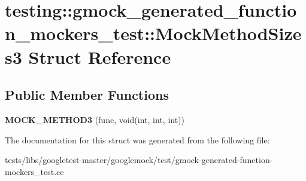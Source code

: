 \hypertarget{structtesting_1_1gmock__generated__function__mockers__test_1_1MockMethodSizes3}{}\section{testing\+:\+:gmock\+\_\+generated\+\_\+function\+\_\+mockers\+\_\+test\+:\+:Mock\+Method\+Sizes3 Struct Reference}
\label{structtesting_1_1gmock__generated__function__mockers__test_1_1MockMethodSizes3}
\subsection*{Public Member Functions}
\begin{DoxyCompactItemize}
\item 
\mbox{\label{structtesting_1_1gmock__generated__function__mockers__test_1_1MockMethodSizes3_a53c9699f920b15d624620e8dab0bfc62}} 
{\bfseries M\+O\+C\+K\+\_\+\+M\+E\+T\+H\+O\+D3} (func, void(int, int, int))
\end{DoxyCompactItemize}


The documentation for this struct was generated from the following file\+:\begin{DoxyCompactItemize}
\item 
tests/libs/googletest-\/master/googlemock/test/gmock-\/generated-\/function-\/mockers\+\_\+test.\+cc\end{DoxyCompactItemize}
